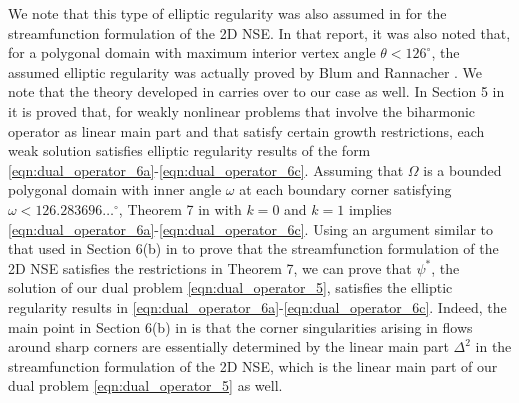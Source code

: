\begin{remark}
  We note that this type of elliptic regularity was also assumed in \cite{Cayco86}
  for the streamfunction formulation of the 2D NSE.  In that report, it was also
  noted that, for a polygonal domain with maximum interior vertex angle $\theta <
  126^{\circ}$, the assumed elliptic regularity was actually proved by Blum and
  Rannacher \cite{blum1980boundary}.  We note that the theory developed in
  \cite{blum1980boundary} carries over to our case as well.  In Section 5 in
  \cite{blum1980boundary} it is proved that, for weakly nonlinear problems that
  involve the biharmonic operator as linear main part and that satisfy certain
  growth restrictions, each weak solution satisfies elliptic regularity results of
  the form \eqref{eqn:dual_operator_6a}-\eqref{eqn:dual_operator_6c}.  Assuming
  that $\Omega$ is a bounded polygonal domain with inner angle $\omega$ at each
  boundary corner satisfying $\omega < 126.283696\ldots^{\circ}$, Theorem 7 in
  \cite{blum1980boundary} with $k = 0$ and $k = 1$ implies
  \eqref{eqn:dual_operator_6a}-\eqref{eqn:dual_operator_6c}.  Using an argument
  similar to that used in Section 6(b) in \cite{blum1980boundary} to prove that
  the streamfunction formulation of the 2D NSE satisfies the restrictions in
  Theorem 7, we can prove that $\psi^*$, the solution of our dual problem
  \eqref{eqn:dual_operator_5}, satisfies the elliptic regularity results in
  \eqref{eqn:dual_operator_6a}-\eqref{eqn:dual_operator_6c}.  Indeed, the main
  point in Section 6(b) in \cite{blum1980boundary} is that the corner
  singularities arising in flows around sharp corners are essentially determined
  by the linear main part $\Delta^2$ in the streamfunction formulation of the 2D
  NSE, which is the linear main part of our dual problem
  \eqref{eqn:dual_operator_5} as well.
\end{remark}

